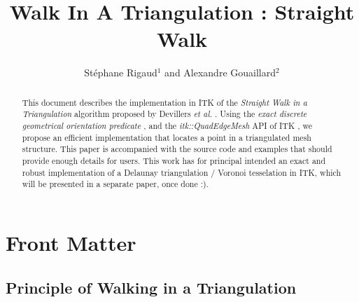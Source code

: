 \documentclass{InsightArticle}
\title{Walk In A Triangulation : Straight Walk}
\author{St\'{e}phane Rigaud$^{1}$ and Alexandre Gouaillard$^{2}$}
\newcommand{\IJhandlerIDnumber}{1338} %
\begin{document}
%
% 
\IJhandlefooter{\IJhandlerIDnumber}


\ifpdf
\else
\fi


\maketitle


\ifhtml
\chapter*{Front Matter\label{front}}
\fi


\begin{abstract}
\noindent
This document describes the implementation in ITK of the \emph{Straight Walk in a Triangulation} algorithm proposed by Devillers \emph{et al.} \cite{Devillers2001}. Using the \emph{exact discrete geometrical orientation predicate} \cite{Moreau2011}, and the \emph{itk::QuadEdgeMesh} API \cite{Gouaillard2006} of ITK , we propose an efficient implementation that locates a point in a triangulated mesh structure. This paper is accompanied with the source code and examples that should provide enough details for users.
This work has for principal intended an exact and robust implementation of a Delaunay triangulation / Voronoi tesselation in ITK, which will be presented in a separate paper, once done :).


\end{abstract}

\IJhandlenote{\IJhandlerIDnumber}

\tableofcontents

\section{Principle of Walking in a Triangulation}
\end{document}
